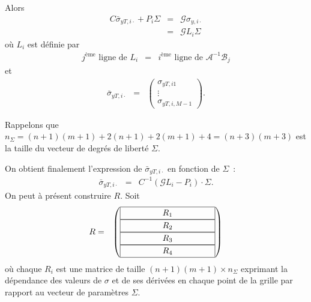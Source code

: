 Alors
\begin{eqnarray*}
C\bar{\sigma}_{yT,i\cdot} + P_i\Sigma &=& 
\mathcal{G}\sigma_{y,i\cdot}\\
&=& \mathcal{G} L_i \Sigma
\end{eqnarray*}
o\`u $L_i$ est d\'efinie par 
\begin{eqnarray*}
j^{\text{\`eme}} \text{ ligne de } L_i &=& i^{\text{\`eme}} 
\text{ ligne de } \mathcal{A}^{-1}\mathcal{B}_j
\end{eqnarray*} et 
\begin{eqnarray*}
\bar{\sigma}_{yT,i\cdot} &=& \begin{pmatrix} \sigma_{yT,i1} 
\\ \vdots \\ \sigma_{yT,i,M-1}\end{pmatrix}.
\end{eqnarray*}

\begin{Rem}
Rappelons que $n_\Sigma =(n+1)(m+1)+2(n+1)+2(m+1)+4 =(n+3)(m+3)$ est 
la taille du vecteur de degr\'es de libert\'e $\Sigma$.
\end{Rem}

On obtient finalement l'expression de $\bar{\sigma}_{yT,i\cdot}$ en 
fonction de $\Sigma$~:
\begin{eqnarray}
\bar{\sigma}_{yT,i\cdot} &=& C^{-1}(\mathcal{G}L_i-P_i)\cdot \Sigma. 
\label{R4_2}
\end{eqnarray}
On peut \`a pr\'esent construire $R$. Soit
\setlength{\fboxsep}{4mm}
\begin{eqnarray*}
R &=& \begin{pmatrix}
\framebox[4cm][c]{$R_1$}\\
\framebox[4cm][c]{$R_2$}\\
\framebox[4cm][c]{$R_3$}\\
\framebox[4cm][c]{$R_4$}
\end{pmatrix}
\end{eqnarray*}
\setlength{\fboxsep}{20pt}
o\`u chaque $R_i$ est une matrice de taille 
$(n+1)(m+1) \times n_{\Sigma}$ exprimant la d\'ependance des valeurs 
de $\sigma$ et de ses d\'eriv\'ees en chaque point de la grille par 
rapport au vecteur de param\`etres $\Sigma$.

